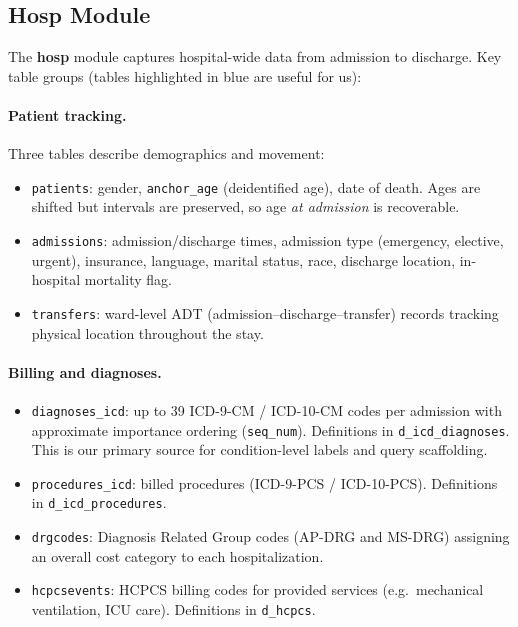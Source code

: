 \documentclass[11pt,a4paper]{article}
\newcommand{\field}[1]{\nolinkurl{#1}}
\newcommand{\importantfield}[1]{\textcolor{betterblue}{\nolinkurl{#1}}}
\begin{document}
\subsection{Hosp Module}
\label{sec:hosp}

The \textbf{hosp} module captures hospital-wide data from admission to discharge.
Key table groups (tables \textcolor{betterblue}{highlighted in blue} are useful for us):

\paragraph{Patient tracking.}
Three tables describe demographics and movement:
\begin{itemize}[itemsep=2pt, parsep=1pt]
	\item \importantfield{patients}: gender, \field{anchor\_age} (deidentified age), date of death.
	      Ages are shifted but intervals are preserved, so age \emph{at admission} is recoverable.
	\item \importantfield{admissions}: admission/discharge times, admission type (emergency, elective, urgent),
	      insurance, language, marital status, race, discharge location, in-hospital mortality flag.
	\item \field{transfers}: ward-level ADT (admission--discharge--transfer) records tracking
	      physical location throughout the stay.
\end{itemize}

\paragraph{Billing and diagnoses.}
\begin{itemize}[itemsep=2pt, parsep=1pt]
	\item \importantfield{diagnoses\_icd}: up to 39 ICD-9-CM / ICD-10-CM codes per admission with
	      approximate importance ordering (\field{seq\_num}).  Definitions in \importantfield{d\_icd\_diagnoses}.
	      This is our primary source for condition-level labels and query scaffolding.
	\item \field{procedures\_icd}: billed procedures (ICD-9-PCS / ICD-10-PCS).
	      Definitions in \field{d\_icd\_procedures}.
	\item \field{drgcodes}: Diagnosis Related Group codes (AP-DRG and MS-DRG) assigning an
	      overall cost category to each hospitalization.
	\item \field{hcpcsevents}: HCPCS billing codes for provided services (e.g.\ mechanical
	      ventilation, ICU care).  Definitions in \field{d\_hcpcs}.
\end{itemize}
\end{document}
